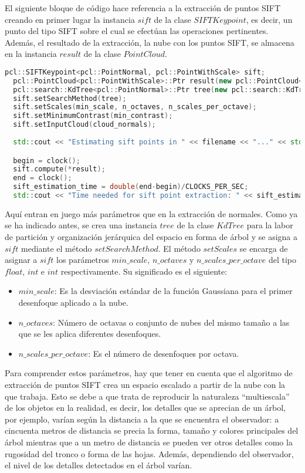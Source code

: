 El siguiente bloque de código hace referencia a la extracción de puntos SIFT creando en primer lugar la instancia $sift$ de la clase $SIFTKeypoint$, es decir, un punto del tipo SIFT sobre el cual se efectúan las operaciones pertinentes. Además, el resultado de la extracción, la nube con los puntos SIFT, se almacena en la instancia $result$ de la clase $PointCloud$.

\begin{lstlisting}[language=C++,breaklines]
  pcl::SIFTKeypoint<pcl::PointNormal, pcl::PointWithScale> sift;
  pcl::PointCloud<pcl::PointWithScale>::Ptr result(new pcl::PointCloud<pcl::PointWithScale>);
  pcl::search::KdTree<pcl::PointNormal>::Ptr tree(new pcl::search::KdTree<pcl::PointNormal> ());
  sift.setSearchMethod(tree);
  sift.setScales(min_scale, n_octaves, n_scales_per_octave);
  sift.setMinimumContrast(min_contrast);
  sift.setInputCloud(cloud_normals);
 
  std::cout << "Estimating sift points in " << filename << "..." << std::endl;

  begin = clock();
  sift.compute(*result);
  end = clock();
  sift_estimation_time = double(end-begin)/CLOCKS_PER_SEC;
  std::cout << "Time needed for sift point extraction: " << sift_estimation_time << " seconds" << std::endl << std::endl;
\end{lstlisting}


Aquí entran en juego más parámetros que en la extracción de normales. Como ya se ha indicado antes, se crea una instancia $tree$ de la clase $KdTree$ para la labor de partición y organización jerárquica del espacio en forma de árbol y se asigna a $sift$ mediante el método $setSearchMethod$.
El método $setScales$ se encarga de asignar a $sift$ los parámetros $min\_scale$, $n\_octaves$ y $n\_scales\_per\_octave$ del tipo $float$, $int$ e $int$ respectivamente. Su significado es el siguiente:

\begin{itemize}
\item[•]$min\_scale$: Es la desviación estándar de la función Gaussiana para el primer desenfoque aplicado a la nube.
\item[•]$n\_octaves$: Número de octavas o conjunto de nubes del mismo tamaño a las que se les aplica diferentes desenfoques.
\item[•]$n\_scales\_per\_octave$: Es el número de desenfoques por octava.
\end{itemize}

Para comprender estos parámetros, hay que tener en cuenta que el algoritmo de extracción de puntos SIFT crea un espacio escalado a partir de la nube con la que trabaja. Esto se debe a que trata de reproducir la naturaleza ``multiescala'' de los objetos en la realidad, es decir, los detalles que se aprecian de un árbol, por ejemplo, varían según la distancia a la que se encuentra el observador: a cincuenta metros de distancia se precia la forma, tamaño y colores principales del árbol mientras que a un metro de distancia se pueden ver otros detalles como la rugosidad del tronco o forma de las hojas. Además, dependiendo del observador, el nivel de los detalles detectados en el árbol varían.

